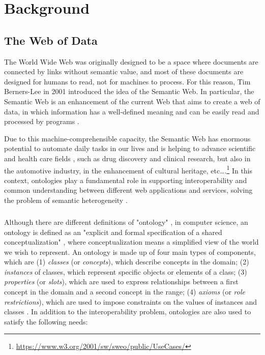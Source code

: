 
\chapter{Background}
\label{chp:background}

\section{The Web of Data}
\label{sec:web-of-data}

The World Wide Web was originally designed to be a space where documents are connected by links without semantic value, and most of these documents are designed for humans to read, not for machines to process. For this reason, Tim Berners-Lee in 2001 introduced the idea of the Semantic Web. In particular, the Semantic Web is an enhancement of the current Web that aims to create a web of data, in which information has a well-defined meaning and can be easily read and processed by programs \cite{berners2001semantic}.

Due to this machine-comprehensible capacity, the Semantic Web has enormous potential to automate daily tasks in our lives and is helping to advance scientific and health care fields \cite{feigenbaum2007semantic}, such as drug discovery and clinical research, but also in the automotive industry, in the enhancement of cultural heritage, etc\dots.\footnote{\url{https://www.w3.org/2001/sw/sweo/public/UseCases/}} In this context, ontologies play a fundamental role in supporting interoperability and common understanding between different web applications and services, solving the problem of semantic heterogeneity \cite{taye2010understanding}.

\paragraph*{}
Although there are different definitions of "ontology" \cite{taye2010understanding}, in computer science, an ontology is defined as an "explicit and formal specification of a shared conceptualization" \cite{gruber1995toward}, where conceptualization means a simplified view of the world we wish to represent. An ontology is made up of four main types of components, which are (1) \textit{classes} (or \textit{concepts}), which describe concepts in the domain; (2) \textit{instances} of classes, which represent specific objects or elements of a class; (3) \textit{properties} (or \textit{slots}), which are used to express relationships between a first concept in the domain and a second concept in the range; (4) \textit{axioms} (or \textit{role restrictions}), which are used to impose constraints on the values of instances and classes \cite{taye2010understanding, noy2001ontology}. In addition to the interoperability problem, ontologies are also used to satisfy the following needs:

